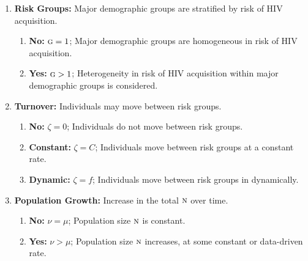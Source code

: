 \begin{fboxed}
  \begin{enumerate}[leftmargin=1em]
    \item \label{ass:risk-groups}\textbf{Risk Groups:}
    Major demographic groups are stratified by risk of HIV acquisition.
    \begin{enumerate}
      \item \label{ass:risk-groups-no}\textbf{No:} $\textsc{g} = 1$;
      Major demographic groups are homogeneous in risk of HIV acquisition.
      \item \label{ass:risk-groups-yes}\textbf{Yes:} $\textsc{g} > 1$;
      Heterogeneity in risk of HIV acquisition within major demographic groups is considered.
    \end{enumerate}
    \item \label{ass:turnover}\textbf{Turnover:}
    Individuals may move between risk groups.
    \begin{enumerate}
      \item \textbf{No:} $\zeta = 0$;
      Individuals do not move between risk groups.
      \item \textbf{Constant:} $\zeta = C$;
      Individuals move between risk groups at a constant rate.
      \item \textbf{Dynamic:} $\zeta = f$;
      Individuals move between risk groups in dynamically.
    \end{enumerate}
    \item \label{ass:pop-growth}\textbf{Population Growth:}
    Increase in the total $\textsc{n}$ over time.
    \begin{enumerate}
      \item \textbf{No:} $\nu = \mu$;
      Population size $\textsc{n}$ is constant.
      \item \textbf{Yes:} $\nu > \mu$;
      Population size $\textsc{n}$ increases, at some constant or data-driven rate.
    \end{enumerate}
  \end{enumerate}
\end{fboxed}
